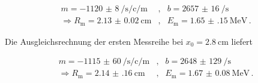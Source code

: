 
		\begin{eqnarray*}
			m = \SI{-1120(8)}{\per \second \per \centi \per \meter} &,& b = \SI{2657(16)}{\per \second} \\
			\Rightarrow R_\mathrm{m} = \SI{2.13(2)}{\centi \meter} &,& E_\mathrm{m} = \SI{1.65(15)}{\mega \electronvolt} \,.
		\end{eqnarray*}

		Die Ausgleichsrechnung der ersten Messreihe bei $x_0 = \SI{2.8}{\centi \meter}$ liefert

		\begin{eqnarray*}
			m = \SI{-1115(60)}{\per \second \per \centi \per \meter} &,& b = \SI{2648(129)}{\per \second} \\
			\Rightarrow R_\mathrm{m} = \SI{2.14(16)}{\centi \meter} &,& E_\mathrm{m} = \SI{1.67(8)}{\mega \electronvolt} \,.
		\end{eqnarray*}